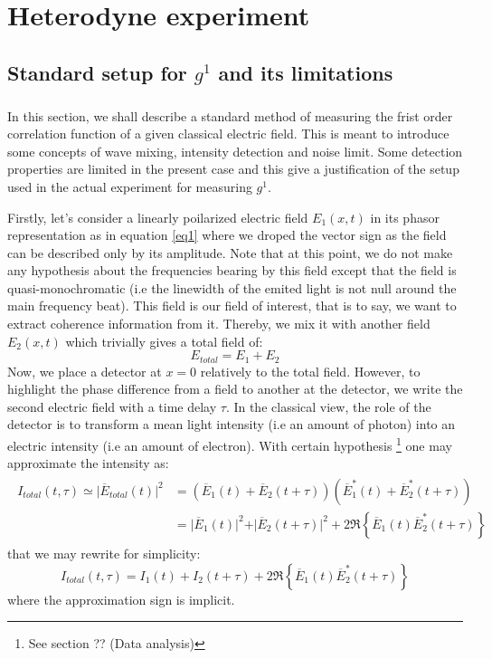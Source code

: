 \documentclass[12pt]{report}
\begin{document}
\chapter{Heterodyne experiment}
\section{Standard setup for $g^1$ and its limitations}
\paragraph{}

In this section, we shall describe a standard method of measuring the frist order correlation function of a given classical electric field. This is meant to introduce some concepts of wave mixing, intensity detection and noise limit. Some detection properties are limited in the present case and this give a justification of the setup used in the actual experiment for measuring $g^1$.

Firstly, let's consider a linearly poilarized electric field $E_1(x, t)$ in its phasor representation as in equation \eqref{eq1} where we droped the vector sign as the field can be described only by its amplitude. Note that at this point, we do not make any hypothesis about the frequencies bearing by this field except that the field is quasi-monochromatic (i.e the linewidth of the emited light is not null around the main frequency beat). This field is our field of interest, that is to say, we want to extract coherence information from it. Thereby, we mix it with another field $E_2(x, t)$ which trivially gives a total field of:
\begin{equation}
\label{e_tot_def}
E_{total} = E_1 + E_2
\end{equation}
Now, we place a detector at $x=0$ relatively to the total field. However, to highlight the phase difference from a field to another at the detector, we write the second electric field with a time delay $\tau$. In the classical view, the role of the detector is to transform a mean light intensity (i.e an amount of photon) into an electric intensity (i.e an amount of electron). With certain hypothesis \footnote{See section ?? (Data analysis)} one may approximate the intensity as:
\begin{align}
\begin{split}
I_{total}(t, \tau) \simeq \vert\overline{E}_{total}(t)\vert^2 &= (\overline{E}_1(t) + \overline{E}_2(t + \tau))(\overline{E}_1^*(t) + \overline{E}_2^*(t + \tau))\\
&= \vert \overline{E}_1(t) \vert^2 + \vert \overline{E}_2(t + \tau) \vert^2 + 2\Re\left\lbrace \overline{E}_1(t)\overline{E}_2^*(t + \tau)\right\rbrace
\end{split}
\end{align}
that we may rewrite for simplicity:
\begin{equation}
I_{total}(t, \tau) = I_1(t) + I_2(t + \tau) + 2\Re\left\lbrace \overline{E}_1(t) \overline{E}_2^*(t + \tau)\right\rbrace
\end{equation}
where the approximation sign is implicit.
\end{document}
